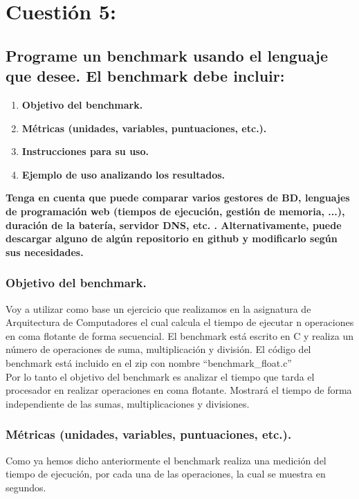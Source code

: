 
\section{Cuestión 5:}
\subsection{Programe un benchmark usando el lenguaje que desee. El benchmark debe incluir:}

\begin{enumerate}
	\item \textbf{Objetivo del benchmark.}
	\item \textbf{Métricas (unidades, variables, puntuaciones, etc.).}
	\item \textbf{Instrucciones para su uso.}
	\item \textbf{Ejemplo de uso analizando los resultados.}
\end{enumerate}

\textbf{Tenga en cuenta que puede comparar varios gestores de BD, lenguajes de programación web (tiempos de ejecución, gestión de memoria, ...), duración de la batería, servidor DNS, etc. . Alternativamente, puede descargar alguno de algún repositorio en github y modificarlo según sus necesidades.}\\

\subsubsection{Objetivo del benchmark.} 
Voy a utilizar como base un ejercicio que realizamos en la asignatura de Arquitectura de Computadores el cual calcula el tiempo de ejecutar n operaciones en coma flotante de forma secuencial. El benchmark está escrito en C y realiza un número de operaciones de suma, multiplicación y división. El código del benchmark está incluido en el zip con nombre ``benchmark\_float.c''\\

Por lo tanto el objetivo del benchmark es analizar el tiempo que tarda el procesador en realizar operaciones en coma flotante. Mostrará el tiempo de forma independiente de las sumas, multiplicaciones y divisiones.


\subsubsection{Métricas (unidades, variables, puntuaciones, etc.).}
Como ya hemos dicho anteriormente el benchmark realiza una medición del tiempo de ejecución, por cada una de las operaciones, la cual se muestra en segundos.

